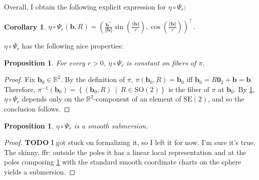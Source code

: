 \documentclass[a4paper,11pt]{scrartcl}
\newcounter{dummy}
\numberwithin{dummy}{section}
\theoremstyle{plain}
\newtheorem{proposition}[dummy]{Proposition}
\theoremstyle{plain}
\theoremstyle{plain}
\theoremstyle{plain}
\newtheorem{corollary}[dummy]{Corollary}
\theoremstyle{nonumberplain}
\newtheorem{proof}{Proof}
\newcommand{\F}[1][R]{\mathbb{#1}} %
\newcommand{\setsep}{\ \middle|\ } %
\newcommand{\Ltwonorm}[1]{\left\Vert #1 \right\Vert} %
\newcommand{\SE}{\mathrm{SE}}
\newcommand{\SO}{\mathrm{SO}}
\begin{document}
	Overall, I obtain the following explicit expression for $ \eta \circ \Psi_{r} $:
	\begin{corollary}
		\label{etaCompPsiFormula}
		$ \eta \circ \Psi_{r} \left(\mathbf{b}, R\right) 
		= \left( \frac{\mathbf{b}^{\top}}{\Ltwonorm{\mathbf{b}}} \sin \left(\frac{\Ltwonorm{\mathbf{b}}}{r}\right), \cos \left(\frac{\Ltwonorm{\mathbf{b}}}{r}\right) \right)^{\top} $.
	\end{corollary}
	
	$ \eta \circ \Psi_{r} $ has the following nice properties:
	\begin{proposition}
		\label{ConstantOnFibers}
		For every $ r > 0 $, $ \eta \circ \Psi_{r} $ is constant on fibers of $ \pi $.
	\end{proposition}
	
	\begin{proof}
		Fix $ \mathbf{b}_{0} \in \F^{2} $. By the definition of $ \pi $, $ \pi (\mathbf{b}_{0}, R) = \mathbf{b}_{0} $ iff $ \mathbf{b}_{0} = R \mathbf{0}_{2} + \mathbf{b} = \mathbf{b} $. Therefore, $ \pi^{-1} (\mathbf{b}_{0}) = \left\{ \left(\mathbf{b}_{0}, R\right) \setsep R \in \SO(2) \right\} $ is the fiber of $ \pi $ at $ \mathbf{b}_{0} $. By \cref{etaCompPsiFormula}, $ \eta \circ \Psi_{r} $ depends only on the $ \F^{2} $-component of an element of $ \SE(2) $, and so the conclusion follows.
	\end{proof}
	
	\begin{proposition}
		\label{etaCompPsiSubmersion}
		$ \eta \circ \Psi_{r} $ is a smooth submersion.
	\end{proposition}
	
	\begin{proof}
		\textbf{TODO} I got stuck on formalizing it, so I left it for now. I'm sure it's true. The skinny, ffr: outside the poles it has a linear local representation and at the poles composing \cref{etaCompPsiFormula} with the standard smooth coordinate charts on the sphere yields a submersion.
	\end{proof}
	
\end{document}
